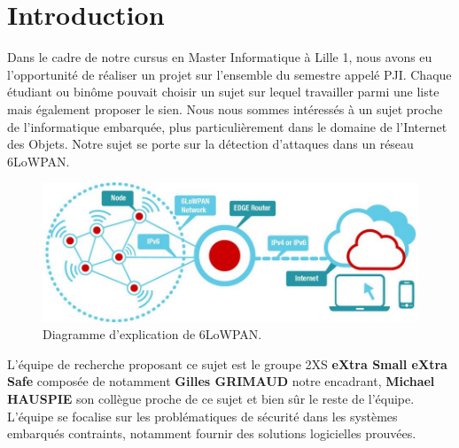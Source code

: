 \chapter*{Introduction}
\label{chap:introduction}

Dans le cadre de notre cursus en Master Informatique à Lille 1, nous avons eu l'opportunité de réaliser un projet sur l’ensemble du semestre appelé PJI. Chaque étudiant ou binôme pouvait choisir un sujet sur lequel travailler parmi une liste mais également proposer le sien.
Nous nous sommes intéressés à un sujet proche de l'informatique embarquée, plus particulièrement dans le domaine de l'Internet des Objets. Notre sujet se porte sur la détection d'attaques dans un réseau 6LoWPAN.

\begin{figure}[htp]
	\centering
	\includegraphics[width=16cm]{images/6lowpan.jpg}
	\caption{Diagramme d'explication de 6LoWPAN.}
	\label{fig:diagramme-6lowpan}
\end{figure}
L'équipe de recherche proposant ce sujet est le groupe 2XS \textbf{eXtra Small eXtra Safe} composée de notamment \textbf{Gilles GRIMAUD} notre encadrant, \textbf{Michael HAUSPIE} son collègue proche de ce sujet et bien sûr le reste de l'équipe.
L'équipe se focalise sur les problématiques de sécurité dans les systèmes embarqués contraints, notamment fournir des solutions logicielles prouvées.

